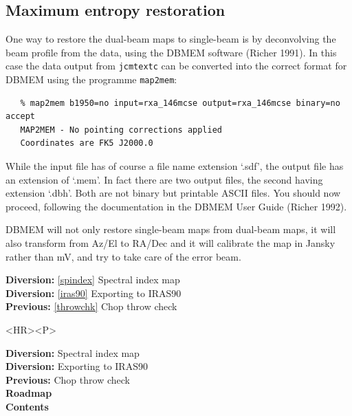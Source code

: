 \documentclass[11pt]{article}
\newenvironment{latexonly}{}{}
\newcommand{\htmlref}[2]{#1}
\newcommand{\xref}[3]{#1}
\newcommand{\xlabel}[1]{}
\begin{document}
\subsection{\label{dbmem}\xlabel{dbmem}Maximum entropy restoration}

   One way to restore the
\htmlref{dual-beam maps}{glossdualbeam}
   to single-beam is by deconvolving the beam
   profile from the data, using the DBMEM software
\htmlref{(Richer 1991).}{refer}
   In this case the data output from
{\tt \xref{jcmtextc}{sun132}{JCMTEXTC}}
   can be converted into the correct format for DBMEM using the
   programme
{\tt \xref{map2mem}{sun132}{MAP2MEM}}:

\begin{verbatim}
   % map2mem b1950=no input=rxa_146mcse output=rxa_146mcse binary=no accept
   MAP2MEM - No pointing corrections applied
   Coordinates are FK5 J2000.0
\end{verbatim}

   While the input file has of course a file name extension `.sdf', the
   output file has an extension of `.mem'. In fact there are two output
   files, the second having extension `.dbh'. Both are not binary but
   printable ASCII files. You should now proceed, following the
   documentation in the DBMEM User Guide
\htmlref{(Richer 1992).}{refer}

   DBMEM will not only restore single-beam maps from dual-beam maps, it
   will also transform from Az/El to RA/Dec and it will calibrate the
   map in Jansky rather than mV, and try to take care of the
\htmlref{error beam.}{glosserrorbeam}

\begin{latexonly}
{\bf Diversion:} \ref{spindex} Spectral index map\\
{\bf Diversion:} \ref{iras90} Exporting to IRAS90\\
{\bf Previous:} \ref{throwchk} Chop throw check\\
\end{latexonly}

\begin{htmlonly}
\begin{rawhtml} <HR><P> \end{rawhtml}
{\bf \htmlref{Diversion:}{spindex}} Spectral index map\\
{\bf \htmlref{Diversion:}{iras90}} Exporting to IRAS90\\
{\bf \htmlref{Previous:}{throwchk}} Chop throw check\\
{\bf \htmlref{Roadmap}{roadmap}}\\
{\bf \htmlref{Contents}{stardoccontents}}\\
\end{htmlonly}
\end{document}
